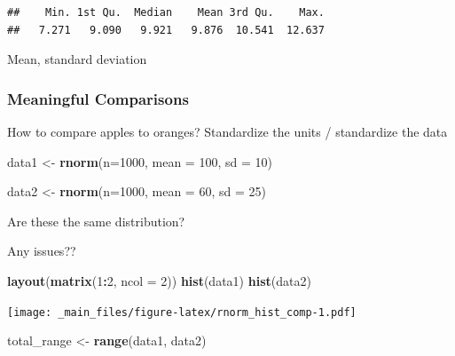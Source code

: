 \documentclass[
]{book}
\newenvironment{Shaded}{\begin{snugshade}}{\end{snugshade}}
\newcommand{\AttributeTok}[1]{\textcolor[rgb]{0.13,0.29,0.53}{#1}}
\newcommand{\DecValTok}[1]{\textcolor[rgb]{0.00,0.00,0.81}{#1}}
\newcommand{\FunctionTok}[1]{\textcolor[rgb]{0.13,0.29,0.53}{\textbf{#1}}}
\newcommand{\NormalTok}[1]{#1}
\newcommand{\OtherTok}[1]{\textcolor[rgb]{0.56,0.35,0.01}{#1}}
\newcommand{\SpecialCharTok}[1]{\textcolor[rgb]{0.81,0.36,0.00}{\textbf{#1}}}
\begin{document}
\begin{verbatim}
##    Min. 1st Qu.  Median    Mean 3rd Qu.    Max. 
##   7.271   9.090   9.921   9.876  10.541  12.637
\end{verbatim}

Mean, standard deviation

\hypertarget{meaningful-comparisons}{%
\subsubsection{Meaningful Comparisons}\label{meaningful-comparisons}}

How to compare apples to oranges? Standardize the units / standardize the data

\begin{Shaded}
\begin{Highlighting}[]
\NormalTok{data1 }\OtherTok{\textless{}{-}} \FunctionTok{rnorm}\NormalTok{(}\AttributeTok{n=}\DecValTok{1000}\NormalTok{, }
              \AttributeTok{mean =} \DecValTok{100}\NormalTok{,}
              \AttributeTok{sd =} \DecValTok{10}\NormalTok{)}

\NormalTok{data2 }\OtherTok{\textless{}{-}} \FunctionTok{rnorm}\NormalTok{(}\AttributeTok{n=}\DecValTok{1000}\NormalTok{,}
               \AttributeTok{mean =} \DecValTok{60}\NormalTok{, }
               \AttributeTok{sd =} \DecValTok{25}\NormalTok{)}
\end{Highlighting}
\end{Shaded}

Are these the same distribution?

Any issues??

\begin{Shaded}
\begin{Highlighting}[]
\FunctionTok{layout}\NormalTok{(}\FunctionTok{matrix}\NormalTok{(}\DecValTok{1}\SpecialCharTok{:}\DecValTok{2}\NormalTok{, }\AttributeTok{ncol =} \DecValTok{2}\NormalTok{))}
\FunctionTok{hist}\NormalTok{(data1)}
\FunctionTok{hist}\NormalTok{(data2)}
\end{Highlighting}
\end{Shaded}

\texttt{[image: \_main\_files/figure-latex/rnorm\_hist\_comp-1.pdf]}

\begin{Shaded}
\begin{Highlighting}[]
\NormalTok{total\_range }\OtherTok{\textless{}{-}} \FunctionTok{range}\NormalTok{(data1, data2)}
\end{Highlighting}
\end{Shaded}
\end{document}
